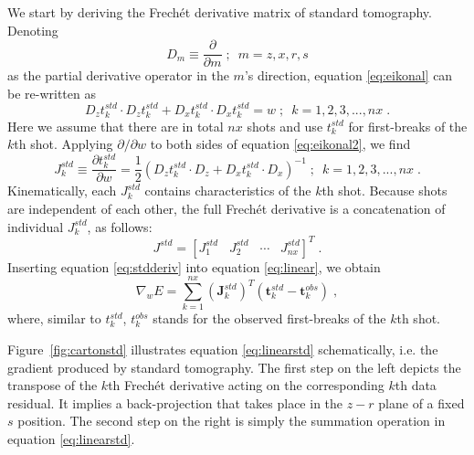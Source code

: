 We start by deriving the Frech\'{e}t derivative matrix of standard tomography. Denoting
\begin{equation}
\label{eq:difference}
D_m \equiv \frac{\partial}{\partial m}\;;\,\,\,
m = z,x,r,s
\end{equation}
as the partial derivative operator in the $m$'s direction, 
equation \ref{eq:eikonal} 
can be re-written as
\begin{equation}
\label{eq:eikonal2}
D_z t^{std}_k \cdot D_zt^{std}_k  + D_x t^{std}_k \cdot D_x t^{std}_k = w\;;\,\,\,
k = 1,2,3,...,nx\;.
\end{equation}
Here we assume that there 
are in total $nx$ shots and use $t^{std}_k$ for first-breaks of the $k$th shot. Applying 
$\partial / \partial w$ to both sides of equation \ref{eq:eikonal2}, we find
\begin{equation}
\label{eq:stdderiv1}
J^{std}_k \equiv 
\frac{\partial t^{std}_k}{\partial w} = 
\frac{1}{2} (D_z t^{std}_k \cdot D_z + 
D_x t^{std}_k \cdot D_x)^{-1}\;;\,\,\,
k = 1,2,3,...,nx\;.
\end{equation}
Kinematically, each $J^{std}_k$ contains characteristics of the 
$k$th shot. Because shots are independent of each other, the full Frech\'{e}t 
derivative is a concatenation of individual $J^{std}_k$, as follows:
\begin{equation}
\label{eq:stdderiv}
J^{std} = \left[ 
J^{std}_1\;\;\;J^{std}_2\;\;\;\cdots\;\;\;J^{std}_{nx}
\right]^T\;.
\end{equation}
Inserting equation \ref{eq:stdderiv} into equation \ref{eq:linear}, we obtain
\begin{equation}
\label{eq:linearstd}
\nabla_w E = 
\sum_{k=1}^{nx} \left(\mathbf{J}^{std}_k\right)^T (\mathbf{t}^{std}_k - \mathbf{t}^{obs}_k)\;,
\end{equation}
where, similar to $t^{std}_k$, $t^{obs}_k$ stands for the observed first-breaks of the $k$th shot. 

Figure~\ref{fig:cartonstd} illustrates equation \ref{eq:linearstd} schematically, i.e. the 
gradient produced by standard tomography. The first step on the left depicts the transpose of the $k$th Frech\'{e}t 
derivative acting on the corresponding $k$th data residual. It implies a back-projection that takes 
place in the $z - r$ plane of a fixed $s$ position. The second step on the right is simply the summation 
operation in equation \ref{eq:linearstd}. 

